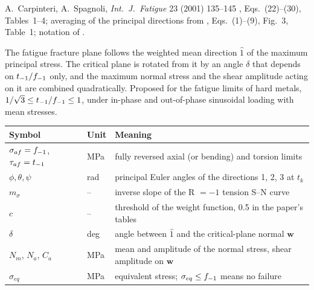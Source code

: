 \label{sheet:CARSPA}

 A.~Carpinteri, A.~Spagnoli, \emph{Int.\ J.\ Fatigue} 23 (2001) 135--145
\cite{carpinteri2001}, Eqs.~(22)--(30), Tables~1--4; averaging of the principal directions from
\cite{carpinteri1999}, Eqs.~(1)--(9), Fig.~3, Table~1; notation of \cite{carpinteri2000}.

 The fatigue fracture plane follows the weighted mean direction $\hat 1$ of
the maximum principal stress. The critical plane is rotated from it by an angle $\delta$ that
depends on $t_{-1}/f_{-1}$ only, and the maximum normal stress and the shear amplitude acting on it are
combined quadratically. Proposed for the fatigue limits of hard metals,
$1/\sqrt3\le t_{-1}/f_{-1}\le1$, under in-phase and out-of-phase sinusoidal loading with mean stresses.

\begin{center}\small
\begin{tabular}{@{}llp{100mm}@{}}
\toprule
Symbol & Unit & Meaning\\\midrule
$\sigma_{af}=f_{-1}$, $\tau_{af}=t_{-1}$ & MPa & fully reversed axial (or bending) and torsion limits\\
$\phi,\theta,\psi$ & rad & principal Euler angles of the directions 1, 2, 3 at $t_k$\\
$m_\sigma$ & -- & inverse slope of the R $=-1$ tension S--N curve\\
$c$ & -- & threshold of the weight function, 0.5 in the paper's tables\\
$\delta$ & deg & angle between $\hat 1$ and the critical-plane normal $\mathbf w$\\
$N_m$, $N_a$, $C_a$ & MPa & mean and amplitude of the normal stress, shear amplitude on $\mathbf w$\\
$\sigma_{eq}$ & MPa & equivalent stress; $\sigma_{eq}\le f_{-1}$ means no failure\\
\bottomrule
\end{tabular}
\end{center}

